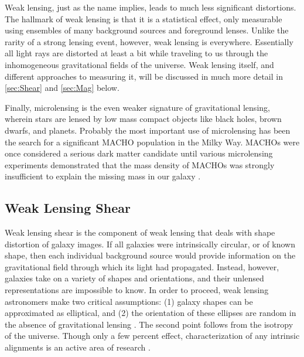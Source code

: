 Weak lensing, just as the name implies, leads to much less significant distortions. The hallmark of weak lensing is that it is a statistical effect, only measurable using ensembles of many background sources and foreground lenses. Unlike the rarity of a strong lensing event, however, weak lensing is everywhere. Essentially all light rays are distorted at least a bit while traveling to us through the inhomogeneous gravitational fields of the universe. Weak lensing itself, and different approaches to measuring it, will be discussed in much more detail in \autoref{sec:Shear} and \autoref{sec:Mag} below. 

Finally, microlensing is the even weaker signature of gravitational lensing, wherein stars are lensed by low mass compact objects like black holes, brown dwarfs, and planets. Probably the most important use of microlensing has been the search for a significant \acf{MACHO} population in the Milky Way. \ac{MACHO}s were once considered a serious dark matter candidate until various microlensing experiments demonstrated that the mass density of \ac{MACHO}s was strongly insufficient to explain the missing mass in our galaxy \citep{Paczynski96,Wyrzykowski11,Sumi13}.


\subsection{Weak Lensing Shear}
\label{sec:Shear}

Weak lensing shear is the component of weak lensing that deals with shape distortion of galaxy images. If all galaxies were intrinsically circular, or of known shape, then each individual background source would provide information on the gravitational field through which its light had propagated. Instead, however, galaxies take on a variety of shapes and orientations, and their unlensed representations are impossible to know. In order to proceed, weak lensing astronomers make two critical assumptions: (1) galaxy shapes can be approximated as elliptical, and (2) the orientation of these ellipses are random in the absence of gravitational lensing \citep{BS01}. The second point follows from the isotropy of the universe. Though only a few percent effect, characterization of any intrinsic alignments is an active area of research \citep[see e.g.][]{Hirata04,Heymans13}.

